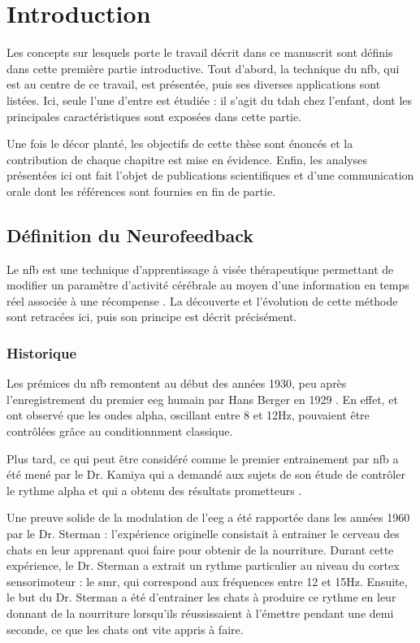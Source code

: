 \chapter{Introduction} \label{chapitre-1}

Les concepts sur lesquels porte le travail décrit dans ce manuscrit sont définis dans cette première partie introductive. Tout d'abord, la technique du \gls{nfb}, 
qui est au centre de ce travail, est présentée, puis ses diverses applications sont listées. Ici, seule l'une d'entre est étudiée : il s'agit du \gls{tdah}
chez l'enfant, dont les principales caractéristiques sont exposées dans cette partie. 

Une fois le décor planté, les objectifs de cette thèse sont énoncés et la contribution de chaque chapitre est mise en évidence. Enfin, les analyses présentées 
ici ont fait l'objet de publications scientifiques et d'une communication orale dont les références sont fournies en fin de partie.  

\section{Définition du Neurofeedback}

Le \gls{nfb} est une technique d’apprentissage à visée thérapeutique permettant de modifier un paramètre d’activité cérébrale au moyen d’une 
information en temps réel associée à une récompense \citep{Arns2014}. 
La découverte et l'évolution de cette méthode sont retracées ici, puis son principe est décrit précisément.

\subsection{Historique}

Les prémices du \gls{nfb} remontent au début des années 1930, peu après l'enregistrement du premier \gls{eeg} humain par Hans Berger en 1929 \citep{Berger1929}.
En effet, \citet{Durup1935} et \citet{Loomis1936} ont observé que les ondes alpha, oscillant entre 8 et 12Hz, pouvaient être contrôlées grâce au 
conditionnment classique. 

Plus tard, ce qui peut être considéré comme le premier entrainement par \gls{nfb} a été mené par le Dr. Kamiya qui a demandé aux sujets de son étude 
de contrôler le rythme alpha et qui a obtenu des résultats prometteurs \citep{Kamiya1969}. 

Une preuve solide de la modulation de l'\gls{eeg} a été rapportée dans les années 1960 par le Dr. Sterman : l'expérience 
originelle consistait à entrainer le cerveau des chats en leur apprenant quoi faire pour obtenir de 
la nourriture. Durant cette expérience, le Dr. Sterman a extrait un rythme particulier au niveau du cortex sensorimoteur : le \gls{smr}, qui correspond 
aux fréquences entre 12 et 15Hz. Ensuite, le but du Dr. Sterman a été d'entrainer les chats à produire ce rythme en leur donnant de la nourriture 
lorsqu'ils réussissaient à l'émettre pendant une demi seconde, ce que les chats ont vite appris à faire. 

